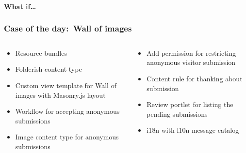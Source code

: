 \documentclass[aspectratio=43]{beamer}
\begin{document}
\begin{frame}[plain,c]
  \huge
  \bfseries
  \centering
  \vspace{1cm}
  What if\ldots
\end{frame}





\begin{frame}[plain,t]
  \frametitle{Case of the day:\ Wall of images}
  \begin{columns}[onlytextwidth,t]
  \begin{column}{0.45\textwidth}
  \begin{itemize}[<+->]
  \setlength{\itemsep}{1em}
  \item Resource bundles
  \item Folderish content type
  \item Custom view template for Wall of images with Masonry.js layout
  \item Workflow for accepting anonymous submissions
  \item Image content type for anonymous submissions
  \end{itemize}
  \end{column}
  \begin{column}{0.45\textwidth}
  \begin{itemize}[<+->]
  \setlength{\itemsep}{1em}
  \item Add permission for restricting anonymous visitor submission
  \item Content rule for thanking about submission
  \item Review portlet for listing the pending submissions
  \item i18n with l10n message catalog
  \end{itemize}
  \end{column}
  \end{columns}
\end{frame}
\end{document}
